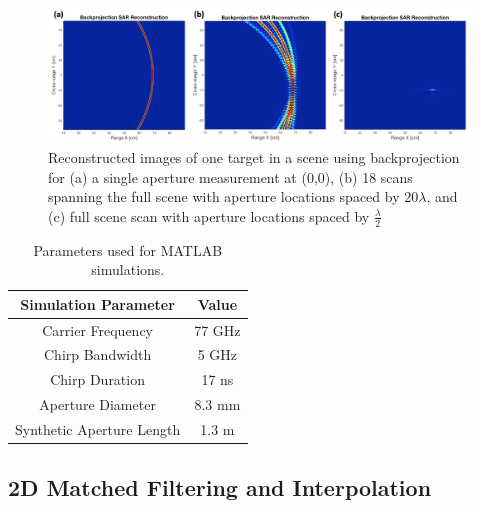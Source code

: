 \documentclass{article}
\begin{document}
\begin{figure}[h!]
    \centering
    \includegraphics[width=\textwidth]{Figures/BackprojectionRecons.png}
\caption{Reconstructed images of one target in a scene using backprojection for (a) a single aperture measurement at (0,0), (b) 18 scans spanning the full scene with aperture locations spaced by $20{\lambda}$, and (c) full scene scan with aperture locations spaced by $\frac{\lambda}{2}$}
\label{BPRecons}
\end{figure}
\begin{table}[h!]
\begin{center}
\begin{tabular}{ |c|c| } 
 \hline
 \textbf{Simulation Parameter} & \textbf{Value} \\ 
 \hline
 Carrier Frequency & 77 GHz \\ 
 \hline
 Chirp Bandwidth & 5 GHz \\ 
 \hline
 Chirp Duration & 17 ns \\ 
 \hline
 Aperture Diameter & 8.3 mm \\ 
 \hline
 Synthetic Aperture Length & 1.3 m \\ 
 \hline
\end{tabular}
\caption{Parameters used for MATLAB simulations.}
\label{table:1}
\end{center}
\end{table}

\subsection{2D Matched Filtering and Interpolation}
\end{document}
